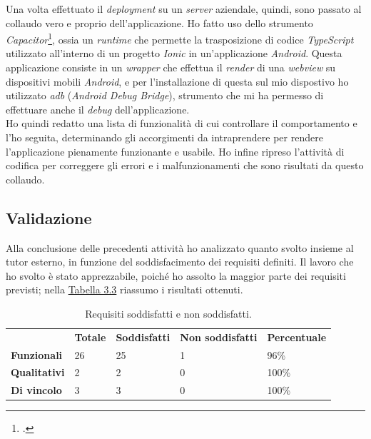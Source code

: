 Una volta effettuato il \textit{deployment} su un \textit{server} aziendale, quindi, sono passato al collaudo vero e proprio dell'applicazione. Ho fatto uso dello strumento \textit{Capacitor}\footcite{tec:capacitor}, ossia un \textit{runtime} che permette la trasposizione di codice \textit{TypeScript} utilizzato all'interno di un progetto \textit{Ionic} in un'applicazione \textit{Android}. Questa applicazione consiste in un \textit{wrapper} che effettua il \textit{render} di una \textit{webview} su dispositivi mobili \textit{Android}, e per l'installazione di questa sul mio dispostivo ho utilizzato \textit{adb} (\textit{Android Debug Bridge}), strumento che mi ha permesso di effettuare anche il \textit{debug} dell'applicazione. \\
Ho quindi redatto una lista di funzionalità di cui controllare il comportamento e l'ho seguita, determinando gli accorgimenti da intraprendere per rendere l'applicazione pienamente funzionante e usabile. Ho infine ripreso l'attività di codifica per correggere gli errori e i malfunzionamenti che sono risultati da questo collaudo.

\subsection*{Validazione}

Alla conclusione delle precedenti attività ho analizzato quanto svolto insieme al tutor esterno, in funzione del soddisfacimento dei requisiti definiti. Il lavoro che ho svolto è stato apprezzabile, poiché ho assolto la maggior parte dei requisiti previsti; nella \hyperref[tab:totale-requisiti-soddifatti]{Tabella 3.3} riassumo i risultati ottenuti.

\begin{table}[h]
  \label{tab:totale-requisiti-soddifatti}
  \begin{center}
    \begin{tabularx}{\textwidth}{lllll}
& \textbf{Totale}         & \textbf{Soddisfatti}    & \textbf{Non soddisfatti} & \textbf{Percentuale}       \\ \cline{2-5}
\multicolumn{1}{l|}{\textbf{Funzionali}}  & \multicolumn{1}{l|}{26} & \multicolumn{1}{l|}{25} & \multicolumn{1}{l|}{1}   & \multicolumn{1}{l|}{96\%}  \\ \cline{2-5}
\multicolumn{1}{l|}{\textbf{Qualitativi}} & \multicolumn{1}{l|}{2}  & \multicolumn{1}{l|}{2}  & \multicolumn{1}{l|}{0}   & \multicolumn{1}{l|}{100\%} \\ \cline{2-5}
\multicolumn{1}{l|}{\textbf{Di vincolo}}  & \multicolumn{1}{l|}{3}  & \multicolumn{1}{l|}{3}  & \multicolumn{1}{l|}{0}   & \multicolumn{1}{l|}{100\%} \\ \cline{2-5}
\end{tabularx}
\end{center}
\caption{Requisiti soddisfatti e non soddisfatti.}
\end{table}

